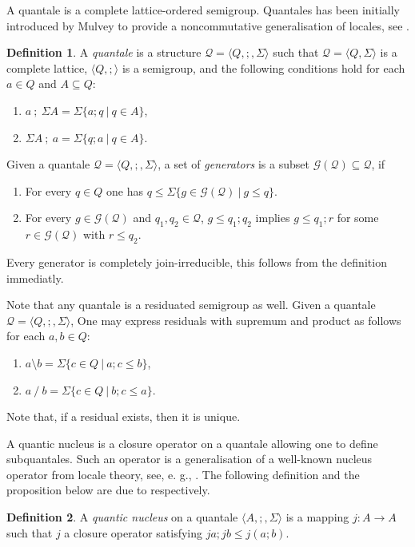 \documentclass[a4paper]{article}
\theoremstyle{definition}
\newtheorem{definition}{Definition}
\theoremstyle{theorem}
\theoremstyle{proposition}
\theoremstyle{lemma}
\theoremstyle{ex}
\theoremstyle{corollary}
\theoremstyle{claim}
\begin{document}
A quantale is a complete lattice-ordered semigroup. Quantales has been initially introduced by Mulvey to provide a noncommutative generalisation of locales, see \cite{mulvey1986suppl}.

\begin{definition}
  A \emph{quantale} is a structure $\mathcal{Q} = \langle Q, ;, \Sigma \rangle$ such that $\mathcal{Q} = \langle Q, \Sigma \rangle$ is a complete lattice, $\langle Q, ; \rangle$ is a semigroup, and the following conditions hold for each $a \in Q$ and $A \subseteq Q$:
  \begin{enumerate}
    \item $a \: ; \: \Sigma A = \Sigma \{ a ; q \: | \: q \in A \}$,
    \item $\Sigma A \: ; \: a = \Sigma \{ q ; a \: | \: q \in A \}$.
  \end{enumerate}
\end{definition}

Given a quantale $\mathcal{Q} = \langle Q, ;, \Sigma \rangle$, a set of \emph{generators} is a subset $\mathcal{G}(\mathcal{Q}) \subseteq \mathcal{Q}$, if
\begin{enumerate}
  \item For every $q \in Q$ one has $q \leq \Sigma \{ g \in \mathcal{G}(\mathcal{Q}) \: | \: g \leq q \}$.
  \item For every $g \in \mathcal{G}(\mathcal{Q})$ and $q_1, q_2 \in \mathcal{Q}$, $g \leq q_1 ; q_2$ implies $g \leq q_1 ; r$ for some $r \in \mathcal{G}(\mathcal{Q})$ with $r \leq q_2$.
\end{enumerate}

Every generator is completely join-irreducible, this follows from the definition immediatly.

Note that any quantale is a residuated semigroup as well. Given a quantale $\mathcal{Q} = \langle Q, ;, \Sigma \rangle$, One may express residuals with supremum and product as follows for each $a, b \in Q$:
\begin{enumerate}
  \item $a \setminus b = \Sigma \{ c \in Q \: | \: a ; c \leq b \}$,
  \item $a \: / \: b = \Sigma \{ c \in Q\: | \: b ; c \leq a \}$.
\end{enumerate}
Note that, if a residual exists, then it is unique.

A quantic nucleus is a closure operator on a quantale allowing one to define subquantales. Such an operator is a generalisation of a well-known nucleus operator from locale theory, see, e. g., \cite{bezhanishvili2016locales}. The following definition and the proposition below are due to \cite[Definition 3.1.1, Theorem 3.1.1]{rosenthal1990quantales} respectively.
\begin{definition}
  A \emph{quantic nucleus} on a quantale $\langle A, ;, \Sigma \rangle$ is a mapping $j : A \to A$ such that $j$ a closure operator satisfying $j a ; j b \leq j (a ; b)$.
\end{definition}
\end{document}
